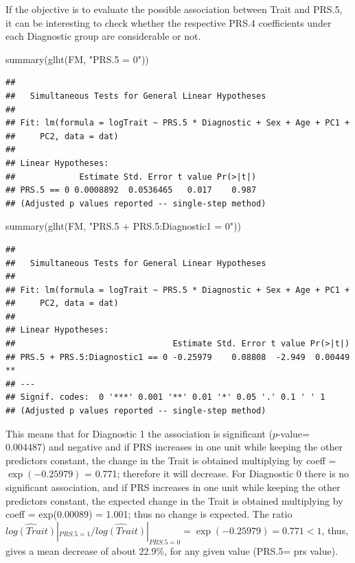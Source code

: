 \documentclass[
]{article}
\newenvironment{Shaded}{\begin{snugshade}}{\end{snugshade}}
\newcommand{\FunctionTok}[1]{\textcolor[rgb]{0.00,0.00,0.00}{#1}}
\newcommand{\NormalTok}[1]{#1}
\newcommand{\StringTok}[1]{\textcolor[rgb]{0.31,0.60,0.02}{#1}}
\begin{document}
If the objective is to evaluate the possible association between Trait
and PRS.5, it can be interesting to check whether the respective PRS.4
coefficients under each Diagnostic group are considerable or not.

\begin{Shaded}
\begin{Highlighting}[]
\FunctionTok{summary}\NormalTok{(}\FunctionTok{glht}\NormalTok{(FM, }\StringTok{"PRS.5 = 0"}\NormalTok{))}
\end{Highlighting}
\end{Shaded}

\begin{verbatim}
## 
##   Simultaneous Tests for General Linear Hypotheses
## 
## Fit: lm(formula = logTrait ~ PRS.5 * Diagnostic + Sex + Age + PC1 + 
##     PC2, data = dat)
## 
## Linear Hypotheses:
##             Estimate Std. Error t value Pr(>|t|)
## PRS.5 == 0 0.0008892  0.0536465   0.017    0.987
## (Adjusted p values reported -- single-step method)
\end{verbatim}

\begin{Shaded}
\begin{Highlighting}[]
\FunctionTok{summary}\NormalTok{(}\FunctionTok{glht}\NormalTok{(FM, }\StringTok{"PRS.5  + PRS.5:Diagnostic1 = 0"}\NormalTok{))}
\end{Highlighting}
\end{Shaded}

\begin{verbatim}
## 
##   Simultaneous Tests for General Linear Hypotheses
## 
## Fit: lm(formula = logTrait ~ PRS.5 * Diagnostic + Sex + Age + PC1 + 
##     PC2, data = dat)
## 
## Linear Hypotheses:
##                                Estimate Std. Error t value Pr(>|t|)   
## PRS.5 + PRS.5:Diagnostic1 == 0 -0.25979    0.08808  -2.949  0.00449 **
## ---
## Signif. codes:  0 '***' 0.001 '**' 0.01 '*' 0.05 '.' 0.1 ' ' 1
## (Adjusted p values reported -- single-step method)
\end{verbatim}

This means that for Diagnostic 1 the association is significant
(\(p\)-value= 0.004487) and negative and if PRS increases in one unit
while keeping the other predictors constant, the change in the Trait is
obtained multiplying by coeff = \(\exp(-0.25979)\) = 0.771; therefore it
will decrease. For Diagnostic 0 there is no significant association, and
if PRS increases in one unit while keeping the other predictors
constant, the expected change in the Trait is obtained multiplying by
coeff = exp(0.00089) = 1.001; thus no change is expected. The ratio
\(\widehat{log(Trait)}|_{PRS.5 = 1}/\widehat{log(Trait)}|_{PRS.5=0} = \exp(-0.25979)=0.771 < 1\),
thus, gives a mean decrease of about 22.9\%, for any given value (PRS.5=
prs value).
\end{document}
